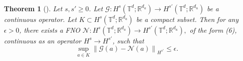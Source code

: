 \documentclass[11pt,a4paper]{article}
\newtheorem{theorem}{Theorem}[section]
\theoremstyle{definition}
\theoremstyle{remark}
\numberwithin{equation}{section}
\numberwithin{figure}{section}
\numberwithin{table}{section}
\begin{document}

\ 


\begin{theorem}[{\cite[Theorem 5]{kovachki2021universal}}]\label{thm:universalapproximation}
Let \(s,s' \ge 0\). Let
$
\mathcal G : H^s(\mathbb T^d;\mathbb R^{d_a})
\to
H^{s'}(\mathbb T^d;\mathbb R^{d_u})
$
be a continuous operator. Let
\(K \subset H^s(\mathbb T^d;\mathbb R^{d_a})\)
be a compact subset. Then for any \(\epsilon > 0\), there exists a FNO
$
\mathcal N : H^s(\mathbb T^d;\mathbb R^{d_a})
\to
H^{s'}(\mathbb T^d;\mathbb R^{d_u}),
$
of the form (6), continuous as an operator \(H^s \to H^{s'}\), such that
\[
\sup_{a\in K}
\left\|
\mathcal G(a)-\mathcal N(a)
\right\|_{H^{s'}}
\le \epsilon .
\]
\end{theorem}
\end{document}
